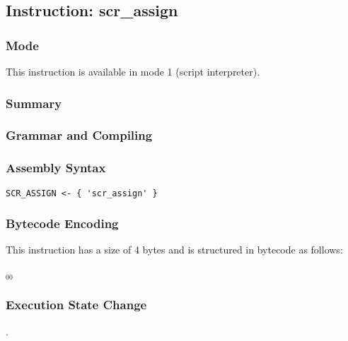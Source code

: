 \subsection{Instruction: scr\_assign}

\subsubsection{Mode}
This instruction is available in mode 1 (script interpreter).
\subsubsection{Summary}


\subsubsection{Grammar and Compiling}


\subsubsection{Assembly Syntax}

\begin{myquote}
\begin{verbatim}
SCR_ASSIGN <- { 'scr_assign' }
\end{verbatim}
\end{myquote}

\subsubsection{Bytecode Encoding}

This instruction has a size of 4 bytes and is structured in bytecode as follows:

$_{00}$\ 

\subsubsection{Execution State Change}

.


